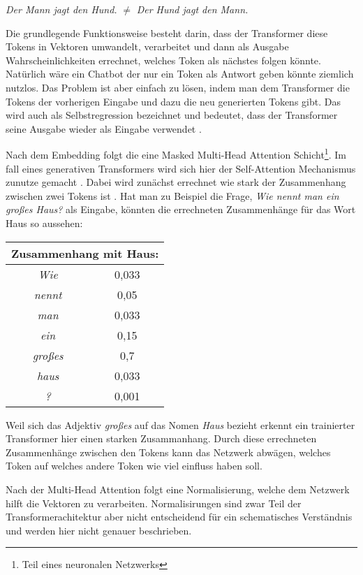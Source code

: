 	\emph{Der Mann jagt den Hund.} 	
	\space $\neq$ \space
	\emph{Der Hund jagt den Mann.}
	
	\clearpage
	Die grundlegende Funktionsweise besteht darin, dass der Transformer diese Tokens in Vektoren umwandelt, verarbeitet und dann 
	als Ausgabe Wahrscheinlichkeiten errechnet, welches Token als nächstes folgen könnte. Natürlich wäre ein Chatbot der nur
	ein Token als Antwort geben könnte ziemlich nutzlos. Das Problem ist aber einfach zu lösen, indem man dem Transformer
	die Tokens der vorherigen Eingabe und dazu die neu generierten Tokens gibt. Das wird auch als Selbstregression bezeichnet und 
	bedeutet, dass der Transformer seine Ausgabe wieder als Eingabe verwendet \cite[S. 2]{vaswani2017}.  

	Nach dem Embedding folgt die eine Masked Multi-Head Attention Schicht\footnote{Teil eines neuronalen Netzwerks}.
	Im fall eines generativen Transformers wird sich hier der  Self-Attention Mechanismus zunutze gemacht \cite[S. 2f]{turner2024}. 
	Dabei wird zunächst errechnet wie stark der Zusammenhang zwischen zwei Tokens ist \cite[S. 4]{vaswani2017}. Hat man zu 
	Beispiel die Frage, \emph{Wie nennt man ein großes Haus?} als Eingabe, könnten die errechneten Zusammenhänge für das 
	Wort Haus so aussehen: 
	
	\vspace{5mm}
	\begin{tabular}{ |c|c| }
  		\hline
	  	\multicolumn{2}{|c|}{Zusammenhang mit Haus: } \\
	  	\hline
	  	\emph{Wie} & 0,033 \\
	  	\hline
	  	\emph{nennt} & 0,05 \\
		\hline
	  	\emph{man} & 0,033 \\
	  	\hline
		\emph{ein} & 0,15 \\
	  	\hline
		\emph{großes} & 0,7 \\
	  	\hline
		\emph{haus} & 0,033 \\
		\hline
		\emph{?} & 0,001 \\
		\hline
	\end{tabular}
	\vspace{5mm}
	
	\noindent Weil sich das Adjektiv \emph{großes} auf das Nomen \emph{Haus} bezieht erkennt ein trainierter Transformer hier
	einen starken Zusammanhang. Durch diese errechneten Zusammenhänge zwischen den Tokens kann das Netzwerk abwägen, welches
	Token auf welches andere Token wie viel einfluss haben soll.	
	
	Nach der Multi-Head Attention folgt eine Normalisierung, welche dem Netzwerk hilft die Vektoren zu verarbeiten. 
	Normalisirungen sind zwar Teil der Transformerachitektur aber nicht entscheidend für ein schematisches Verständnis
	und werden hier nicht genauer beschrieben\cite[S.3]{vaswani2017}. 

